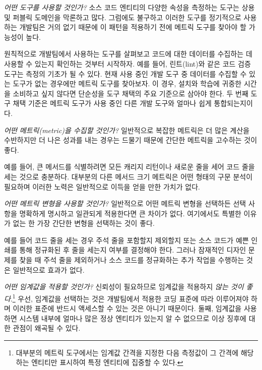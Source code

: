 \documentclass[a4paper,10pt,twoside]{book}
\begin{document}
\begin{bulletlist}
\item \emph{어떤 도구를 사용할 것인가?}
소스 코드 엔티티의 다양한 속성을 측정하는 도구는 상용 및 퍼블릭 도메인을 막론하고 많다. 그럼에도 불구하고 이러한 도구를 정기적으로 사용하는 개발팀은 거의 없기 때문에 이 패턴을 적용하기 전에 메트릭 도구를 찾아야 할 가능성이 높다.

원칙적으로 개발팀에서 사용하는 도구를 살펴보고 코드에 대한 데이터를 수집하는 데 사용할 수 있는지 확인하는 것부터 시작하자. 예를 들어, 린트(lint)와 같은 코드 검증 도구는 측정의 기초가 될 수 있다. 현재 사용 중인 개발 도구 중 데이터를 수집할 수 있는 도구가 없는 경우에만 메트릭 도구를 찾아보자. 이 경우, 설치와 학습에 귀중한 시간을 소비하고 싶지 않다면 단순성을 도구 채택의 주요 기준으로 삼아야 한다. 두 번째 도구 채택 기준은 메트릭 도구가 사용 중인 다른 개발 도구와 얼마나 쉽게 통합되는지이다.

\item \emph{어떤 메트릭(metric)을 수집할 것인가?}
일반적으로 복잡한 메트릭은 더 많은 계산을 수반하지만 더 나은 성과를 내는 경우는 드물기 때문에 간단한 메트릭을 고수하는 것이 좋다.

예를 들어, 큰 메서드를 식별하려면 모든 캐리지 리턴이나 새로운 줄을 세어 코드 줄을 세는 것으로 충분하다. 대부분의 다른 메서드 크기 메트릭은 어떤 형태의 구문 분석이 필요하며 이러한 노력은 일반적으로 이득을 얻을 만한 가치가 없다.

\item \emph{어떤 메트릭 변형을 사용할 것인가?}
일반적으로 어떤 메트릭 변형을 선택하든 선택 사항을 명확하게 명시하고 일관되게 적용한다면 큰 차이가 없다. 여기에서도 특별한 이유가 없는 한 가장 간단한 변형을 선택하는 것이 좋다.

예를 들어 코드 줄을 세는 경우 주석 줄을 포함할지 제외할지 또는 소스 코드가 예쁜 인쇄를 통해 정규화된 후 줄을 세는지 여부를 결정해야 한다. 그러나 잠재적인 디자인 문제를 찾을 때 주석 줄을 제외하거나 소스 코드를 정규화하는 추가 작업을 수행하는 것은 일반적으로 효과가 없다.

\item \emph{어떤 임계값을 적용할 것인가?}
신뢰성이 필요하므로 임계값을 적용하지 \emph{않는 것이 좋다}.\footnote{대부분의 메트릭 도구에서는 임계값 간격을 지정한 다음 측정값이 그 간격에 해당하는 엔티티만 표시하여 특정 엔티티에 집중할 수 있다.} 우선, 임계값을 선택하는 것은 개발팀에서 적용한 코딩 표준에 따라 이루어져야 하며 이러한 표준에 반드시 액세스할 수 있는 것은 아니기 때문이다. 둘째, 임계값을 사용하면 시스템 내부에 얼마나 많은 정상 엔티티가 있는지 알 수 없으므로 이상 징후에 대한 관점이 왜곡될 수 있다.


\end{bulletlist}
\end{document}
